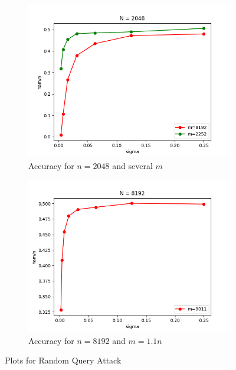 \begin{figure}
\begin{subfigure}[b]{0.49\textwidth}
        \includegraphics[width=\textwidth]{random/Random-N2048.png}
        \caption{Accuracy for $n=2048$ and several $m$}
    \end{subfigure}
    \begin{subfigure}[b]{0.49\textwidth}
        \includegraphics[width=\textwidth]{random/Random-N8192.png}
        \caption{Accuracy for $n=8192$ and $m=1.1n$}
    \end{subfigure}
    \caption{Plots for Random Query Attack}\label{fig:random}
\end{figure}